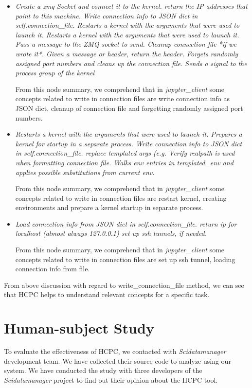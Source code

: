 \begin{itemize}
    \item \emph{Create a zmq Socket and connect it to the kernel. return the IP addresses that point to this machine. Write connection info to JSON dict in self.connection\_file. Restarts a kernel with the arguments that were used to launch it. Restarts a kernel with the arguments that were used to launch it. Pass a message to the ZMQ socket to send. Cleanup connection file *if we wrote it*. Given a message or header, return the header. Forgets randomly assigned port numbers and cleans up the connection file. Sends a signal to the process group of the kernel }
    
    From this node summary, we comprehend that in \emph{jupyter\_client} some concepts related to write in connection files are write connection info as JSON dict, cleanup of connection file and forgetting randomly assigned port numbers.
    
    \item \emph{ Restarts a kernel with the arguments that were used to launch it. Prepares a kernel for startup in a separate process. Write connection info to JSON dict in self.connection\_file. replace templated args (e.g. Verify realpath is used when formatting connection file. Walks env entries in templated\_env and applies possible substitutions from current env.}
    
    From this node summary, we comprehend that in \emph{jupyter\_client} some concepts related to write in connection files are restart kernel, creating environments and prepare a kernel startup in separate process.
    
    \item \emph{Load connection info from JSON dict in self.connection\_file. return ip for localhost (almost always 127.0.0.1) set up ssh tunnels, if needed.} 
    
    From this node summary, we comprehend that in \emph{jupyter\_client} some concepts related to write in connection files are set up ssh tunnel, loading connection info from file.
    
    
\end{itemize}

From above discussion with regard to write\_connection\_file method, we can see that HCPC helps to understand relevant concepts for a specific task. 

\section{Human-subject Study}
\label{hla3:human_study}
To evaluate the effectiveness of HCPC, we contacted with \emph{Scidatamanager} development team. We have collected their source code to analyze using our system. We have conducted the study with three developers of the \emph{Scidatamanager} project to find out their opinion about the HCPC tool.

